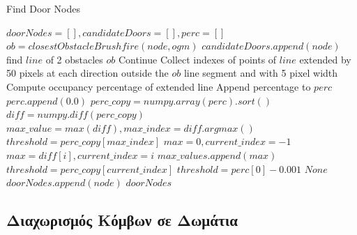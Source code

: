 \begin{algorithm}[H]
\caption{Find Door Nodes}
\label{alg:find_door_nodes}
\begin{algorithmic}[1]
        \State $doorNodes = [], candidateDoors = [], perc = []$
            \State $ob = closestObstacleBrushfire(node, ogm)$
                \State $candidateDoors.append(node)$
                \State find $line$ of 2 obstacles $ob$
                \State {}
                    \State Continue
                \EndIf
                \State Collect indexes of points of $line$ extended by 50 pixels at each direction outside the $ob$ line segment and with 5 pixel width
                \State Compute occupancy percentage of extended line
                \State Append percentage to $perc$
            \EndIf
        \EndFor
        \State $perc.append(0.0)$
            \State $perc\_copy = numpy.array(perc).sort()$
            \State $diff = numpy.diff(perc\_copy)$
            \State $max\_value = max(diff), max\_index = diff.argmax()$
            \State $threshold = perc\_copy[max\_index]$
                \State $max = 0, current\_index = -1$
                        \State $max = diff[i], current\_index = i$
                    \EndIf
                \EndFor
            \State $max\_values.append(max)$
            \State $threshold = perc\_copy[current\_index]$
            \EndWhile
            \State $threshold = perc[0] - 0.001$
        \Else
            \State \Return $None$
        \EndIf
                \State $doorNodes.append(node)$
            \EndIf
        \EndFor
        \State \Return $doorNodes$
\end{algorithmic}
\end{algorithm}


\subsection{Διαχωρισμός Κόμβων σε Δωμάτια}
\label{subsection:find_room_nodes}

